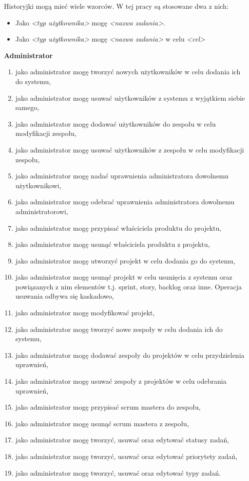 Historyjki mogą mieć wiele wzorców. W tej pracy są stosowane dwa z nich:
\begin{itemize}
	\item Jako \textit{\textless typ użytkownika\textgreater} mogę \textit{\textless nazwa zadania\textgreater}.
	\item Jako \textit{\textless typ użytkownika\textgreater} mogę \textit{\textless nazwa zadania\textgreater} w celu \textit{\textless cel\textgreater}\cite{SCRUM}
\end{itemize} 


\textbf{Administrator}
\begin{enumerate}	
	\item jako administrator mogę tworzyć nowych użytkowników w celu dodania ich do systemu,
	\item jako administrator mogę usuwać użytkowników z systemu z wyjątkiem siebie samego,
	\item jako administrator mogę dodawać użytkowników do zespołu w celu modyfikacji zespołu,
	\item jako administrator mogę usuwać użytkowników z zespołu w celu modyfikacji zespołu,
	\item jako administrator mogę nadać uprawnienia administratora dowolnemu użytkownikowi,
	\item jako administrator mogę odebrać uprawnienia administratora dowolnemu administratorowi,
	\item jako administrator mogę przypisać właściciela produktu do projektu,
	\item jako administrator mogę usunąć właściciela produktu z projektu,
	\item jako administrator mogę utworzyć projekt w celu dodania go do systemu,
	\item jako administrator mogę usunąć projekt w celu usunięcia z systemu oraz powiązanych z nim elementów t.j. sprint, story, backlog oraz inne. Operacja usuwania odbywa się kaskadowo,
	\item jako administrator mogę modyfikować projekt,
	\item jako administrator mogę tworzyć nowe zespoły w celu dodania ich do systemu,
	\item jako administrator mogę dodawać zespoły do projektów w celu przydzielenia uprawnień,
	\item jako administrator mogę usuwać zespoły z projektów w celu odebrania uprawnień,
	\item jako administrator mogę przypisać scrum mastera do zespołu,
	\item jako administrator mogę usunąć scrum mastera z zespołu,
	\item jako administrator mogę tworzyć, usuwać oraz edytować statusy zadań,
	\item jako administrator mogę tworzyć, usuwać oraz edytować priorytety zadań,
	\item jako administrator mogę tworzyć, usuwać oraz edytować typy zadań.
\end{enumerate}		
